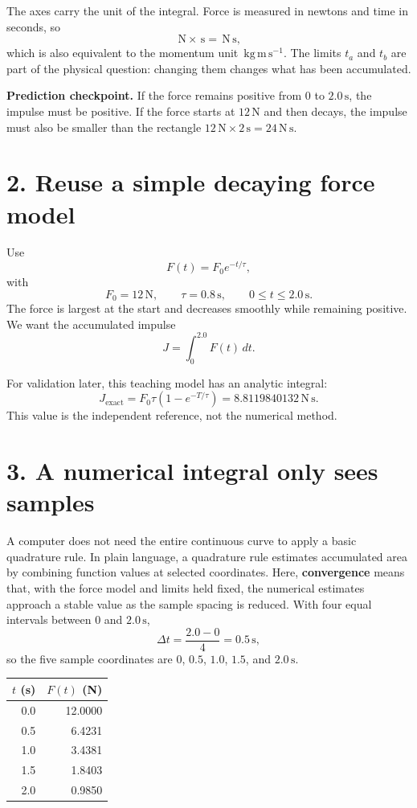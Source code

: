 \documentclass[11pt,a4paper]{article}
\newcommand{\units}[1]{\,\mathrm{#1}}
\begin{document}
The axes carry the unit of the integral. Force is measured in newtons and time in seconds, so
\[
\units{N}\times\units{s}=\units{N\,s},
\]
which is also equivalent to the momentum unit $\units{kg\,m\,s^{-1}}$. The limits $t_a$ and $t_b$ are part of the physical question: changing them changes what has been accumulated.

\begin{checkbox}\textbf{Prediction checkpoint.} If the force remains positive from $0$ to $2.0\units{s}$, the impulse must be positive. If the force starts at $12\units{N}$ and then decays, the impulse must also be smaller than the rectangle $12\units{N}\times2\units{s}=24\units{N\,s}$.\end{checkbox}

\section*{2. Reuse a simple decaying force model}
Use
\[
F(t)=F_0e^{-t/\tau},
\]
with
\[
F_0=12\units{N},\qquad \tau=0.8\units{s},\qquad 0\le t\le2.0\units{s}.
\]
The force is largest at the start and decreases smoothly while remaining positive. We want the accumulated impulse
\[
J=\int_0^{2.0}F(t)\,dt.
\]

For validation later, this teaching model has an analytic integral:
\[
J_{\mathrm{exact}}=F_0\tau\left(1-e^{-T/\tau}\right)
=8.8119840132\units{N\,s}.
\]
This value is the independent reference, not the numerical method.

\section*{3. A numerical integral only sees samples}
A computer does not need the entire continuous curve to apply a basic quadrature rule. In plain language, a quadrature rule estimates accumulated area by combining function values at selected coordinates. Here, \textbf{convergence} means that, with the force model and limits held fixed, the numerical estimates approach a stable value as the sample spacing is reduced. With four equal intervals between $0$ and $2.0\units{s}$,
\[
\Delta t=\frac{2.0-0}{4}=0.5\units{s},
\]
so the five sample coordinates are $0$, $0.5$, $1.0$, $1.5$, and $2.0\units{s}$.

\begin{center}\small
\begin{tabular}{rr}
\toprule
$t$ (s) & $F(t)$ (N)\\
\midrule
0.0 & 12.0000\\
0.5 & 6.4231\\
1.0 & 3.4381\\
1.5 & 1.8403\\
2.0 & 0.9850\\
\bottomrule
\end{tabular}
\end{center}
\end{document}

